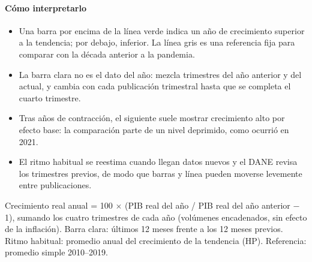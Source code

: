 \paragraph{Cómo interpretarlo}
\begin{itemize}
\item Una barra por encima de la línea verde indica un año de crecimiento superior a la tendencia; por debajo, inferior. La línea gris es una referencia fija para comparar con la década anterior a la pandemia.
\item La barra clara no es el dato del año: mezcla trimestres del año anterior y del actual, y cambia con cada publicación trimestral hasta que se completa el cuarto trimestre.
\item Tras años de contracción, el siguiente suele mostrar crecimiento alto por efecto base: la comparación parte de un nivel deprimido, como ocurrió en 2021.
\item El ritmo habitual se reestima cuando llegan datos nuevos y el DANE revisa los trimestres previos, de modo que barras y línea pueden moverse levemente entre publicaciones.
\end{itemize}
\begin{formulas}[Fórmulas]
\end{formulas}
\begin{metodo}[Metodología]
Crecimiento real anual = 100 $\times$ (PIB real del año / PIB real del año anterior − 1), sumando los cuatro trimestres de cada año (volúmenes encadenados, sin efecto de la inflación). Barra clara: últimos 12 meses frente a los 12 meses previos. Ritmo habitual: promedio anual del crecimiento de la tendencia (HP). Referencia: promedio simple 2010–2019.
\par{}
\end{metodo}

